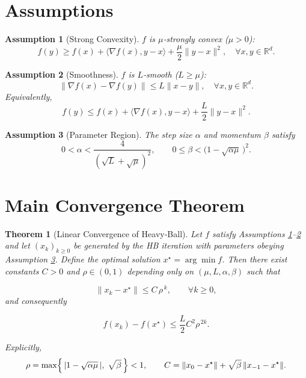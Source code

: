 \documentclass{article}
\newtheorem{theorem}{Theorem}
\newtheorem{assumption}{Assumption}
\begin{document}
\newpage

\section*{Assumptions}
\begin{assumption}[Strong Convexity]\label{as:strong}
$f$ is $\mu$‑strongly convex ($\mu>0$):
\[
f(y)\ge f(x)+\langle\nabla f(x),y-x\rangle+\frac{\mu}{2}\|y-x\|^{2},
\quad\forall x,y\in\mathbb{R}^{d}.
\]
\end{assumption}
\begin{assumption}[Smoothness]\label{as:smooth}
$f$ is $L$‑smooth ($L\ge\mu$):
\[
\|\nabla f(x)-\nabla f(y)\|\le L\|x-y\|,\quad\forall x,y\in\mathbb{R}^{d}.
\]
Equivalently,
\[
f(y)\le f(x)+\langle\nabla f(x),y-x\rangle+\frac{L}{2}\|y-x\|^{2}.
\]
\end{assumption}
\begin{assumption}[Parameter Region]\label{as:param}
The step size $\alpha$ and momentum $\beta$ satisfy
\[
0<\alpha<\frac{4}{(\sqrt{L}+\sqrt{\mu})^{2}},\qquad
0\le\beta<\bigl(1-\sqrt{\alpha\mu}\,\bigr)^{2}.
\]
\end{assumption}

\section*{Main Convergence Theorem}
\begin{theorem}[Linear Convergence of Heavy‑Ball]\label{thm:lin}
Let $f$ satisfy Assumptions \ref{as:strong}–\ref{as:smooth} and let $(x_{k})_{k\ge0}$ be generated by the HB iteration with parameters obeying Assumption \ref{as:param}.  
Define the optimal solution $x^{\star}=\arg\min f$.  
Then there exist constants $C>0$ and $\rho\in(0,1)$ depending only on $(\mu,L,\alpha,\beta)$ such that  

\[
\|x_{k}-x^{\star}\|\le C\,\rho^{\,k},\qquad\forall k\ge0,
\]
and consequently  

\[
f(x_{k})-f(x^{\star})\le \frac{L}{2}C^{2}\rho^{\,2k}.
\]

Explicitly,
\[
\rho=\max\Bigl\{\,|1-\sqrt{\alpha\mu}\,|,\;\sqrt{\beta}\,\Bigr\}<1,
\qquad 
C=\|x_{0}-x^{\star}\|+\sqrt{\beta}\,\|x_{-1}-x^{\star}\|.
\]
\end{theorem}
\end{document}
